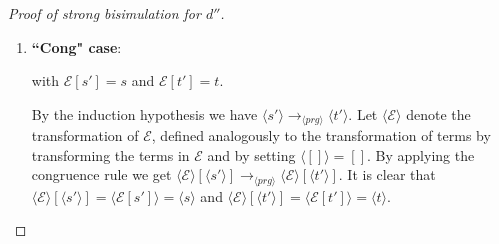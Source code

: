 \documentclass[11pt]{article} %
\begin{document}
\begin{proof}[Proof of strong bisimulation for $d''$]
\begin{enumerate}
\begin{itemize}
For well-typedness, simply treat the missing types temporarily, that is, for the sake of (*), as codata types. This is no problem for the restriction to the domain of $d^{core}$, since such types could be introduced inside the Codata Fragment with codata definitions. To be more precise, empty function definitions can be added for missing ones and empty codata definitions for missing types, and removed again after using (*), without adding or removing possible reductions, respectively. All in all, we have by (*):
\begin{equation*}
s \longrightarrow_{prg'} t \iff \langle s \rangle \longrightarrow_{\langle prg' \rangle^{d^{core}}} \langle t \rangle
\end{equation*}

But this program $\langle prg' \rangle^{d^{core}}$ is a subset of $\langle prg \rangle$, as can be seen in the definition of $d''$. This implies the desired $\langle s \rangle \longrightarrow_{\langle prg \rangle} \langle t \rangle$.

\end{itemize}

Other cases are excluded by the relevant input fragment.

\item \textbf{``Cong" case}:

\begin{prooftree}
\end{prooftree}

with $\mathcal{E}[s'] = s$ and $\mathcal{E}[t'] = t$.

By the induction hypothesis we have $\langle s' \rangle \longrightarrow_{\langle prg \rangle} \langle t' \rangle$. Let $\langle \mathcal{E} \rangle$ denote the transformation of $\mathcal{E}$, defined analogously to the transformation of terms by transforming the terms in $\mathcal{E}$ and by setting $\langle [] \rangle = []$. By applying the congruence rule we get $\langle \mathcal{E} \rangle[\langle s' \rangle] \longrightarrow_{\langle prg \rangle} \langle \mathcal{E} \rangle[\langle t' \rangle]$. It is clear that $\langle \mathcal{E} \rangle[\langle s' \rangle] = \langle \mathcal{E}[s'] \rangle = \langle s \rangle$ and $\langle \mathcal{E} \rangle[\langle t' \rangle] = \langle \mathcal{E}[t'] \rangle = \langle t \rangle$.

\end{enumerate}


\end{proof}
\end{document}
